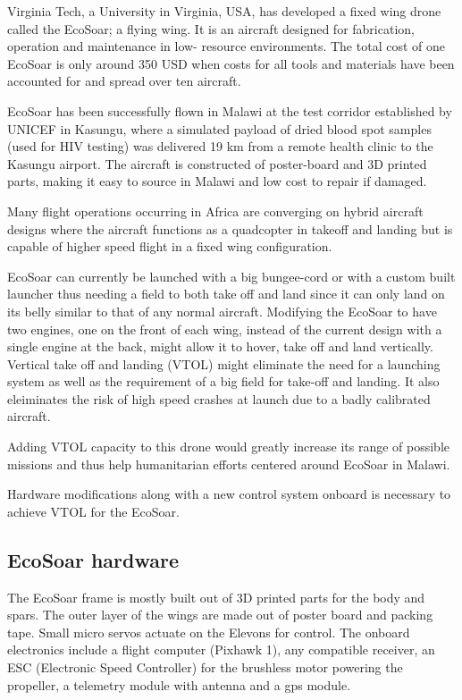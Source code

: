 Virginia Tech, a University in Virginia, USA, has developed a fixed wing drone called the EcoSoar; a flying wing.
It is an aircraft designed for fabrication, operation and maintenance in low-
resource environments.
The total cost of one EcoSoar is only around 350 USD when costs for all tools and materials have been accounted for and spread over ten aircraft. \cite{EcoSoarCost}

EcoSoar has been successfully flown in Malawi at the test corridor established by UNICEF in Kasungu, where a simulated payload of dried blood spot samples (used for HIV testing) was delivered 19 km from a remote health clinic to the Kasungu airport.
The aircraft is constructed of poster-board and 3D printed parts, making it easy to source in Malawi and low cost to repair if damaged.

Many flight operations occurring in Africa are converging on hybrid aircraft designs where the aircraft functions as a quadcopter in takeoff and landing but is capable of higher speed flight in a fixed wing configuration. \cite{swoopaero} \cite{wingcopter}

EcoSoar can currently be launched with a big bungee-cord or with a custom built launcher thus needing a field to both take off and land since it can only land on its belly similar to that of any normal aircraft.
Modifying the EcoSoar to have two engines, one on the front of each wing, instead of the current design with a single engine at the back, might allow it to hover, take off and land vertically.
Vertical take off and landing (VTOL) might eliminate the need for a launching system as well as the requirement of a big field for take-off and landing.
It also eleiminates the risk of high speed crashes at launch due to a badly calibrated aircraft.

Adding VTOL capacity to this drone would greatly increase its range of possible missions and thus help humanitarian efforts centered around EcoSoar in Malawi.

Hardware modifications along with a new control system onboard is necessary to achieve VTOL for the EcoSoar.

\subsection{EcoSoar hardware}
The EcoSoar frame is mostly built out of 3D printed parts for the body and spars.
The outer layer of the wings are made out of poster board and packing tape.
Small micro servos actuate on the Elevons for control.
The onboard electronics include a flight computer (Pixhawk 1), any compatible receiver, an ESC (Electronic Speed Controller) for the brushless motor powering the propeller, a telemetry module with antenna and a gps module. \cite{zack}